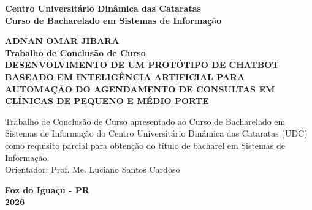 \documentclass[12pt,a4paper]{extarticle}
\begin{document}
\pagestyle{empty}%
\let\estiloOriginal\thispagestyle
\renewcommand{\thispagestyle}[1]{\estiloOriginal{empty}}%

\begin{titlepage}
    \begin{center}
        \textbf{Centro Universitário Dinâmica das Cataratas}\\
        \textbf{Curso de Bacharelado em Sistemas de Informação}\\
        \vspace{3cm}

        \textbf{ADNAN OMAR JIBARA}\\

        \vspace{3cm}
        \textbf{Trabalho de Conclusão de Curso}\\
        \vspace{0.5cm}
        \textbf{DESENVOLVIMENTO DE UM PROTÓTIPO DE CHATBOT BASEADO EM INTELIGÊNCIA ARTIFICIAL PARA AUTOMAÇÃO DO AGENDAMENTO DE CONSULTAS EM CLÍNICAS DE PEQUENO E MÉDIO PORTE}\\

        \vspace{3cm}
        \begin{flushright}
        \begin{minipage}{8cm}
            Trabalho de Conclusão de Curso apresentado ao Curso de Bacharelado em Sistemas de Informação do Centro Universitário Dinâmica das Cataratas (UDC) como requisito parcial para obtenção do título de bacharel em Sistemas de Informação.\\

            Orientador: Prof. Me. Luciano Santos Cardoso
            \vspace{3cm}
        \end{minipage}
        \end{flushright}

        \vfill
        \textbf{Foz do Iguaçu - PR}\\
        \textbf{2026}
    \end{center}
\end{titlepage}
\setcounter{page}{2}%
\end{document}
